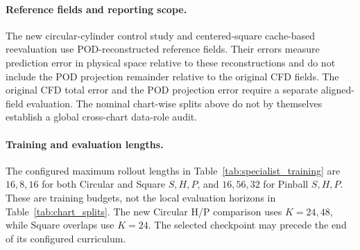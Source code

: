 \paragraph{Reference fields and reporting scope.}
The new circular-cylinder control study and centered-square cache-based
reevaluation use POD-reconstructed reference fields. Their errors measure
prediction error in physical space relative to these reconstructions and
do not include the POD projection remainder relative to the original CFD
fields. The original CFD total error and the POD projection error require
a separate aligned-field evaluation. The nominal chart-wise splits above
do not by themselves establish a global cross-chart data-role audit.

\paragraph{Training and evaluation lengths.}
The configured maximum rollout lengths in Table~\ref{tab:specialist_training}
are $16,8,16$ for both Circular and Square $S,H,P$, and $16,56,32$ for
Pinball $S,H,P$. These are training budgets, not the local evaluation
horizons in Table~\ref{tab:chart_splits}. The new Circular H/P comparison
uses $K=24,48$, while Square overlaps use $K=24$. The selected checkpoint
may precede the end of its configured curriculum.
